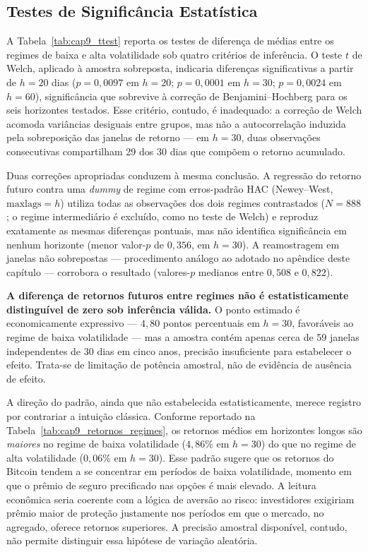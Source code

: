 \subsection{Testes de Significância Estatística}
\label{sec:cap9_ttest}

A Tabela~\ref{tab:cap9_ttest} reporta os testes de diferença de médias
entre os regimes de baixa e alta volatilidade sob quatro critérios de
inferência. O teste $t$ de Welch, aplicado à amostra sobreposta,
indicaria diferenças significativas a partir de $h = 20$ dias
($p = 0{,}0097$ em $h=20$; $p = 0{,}0001$ em $h=30$; $p = 0{,}0024$ em
$h=60$), significância que sobrevive à correção de Benjamini--Hochberg
para os seis horizontes testados. Esse critério, contudo, é inadequado:
a correção de Welch acomoda variâncias desiguais entre grupos, mas não
a autocorrelação induzida pela sobreposição das janelas de retorno --- em
$h=30$, duas observações consecutivas compartilham 29 dos 30 dias que
compõem o retorno acumulado.

Duas correções apropriadas conduzem à mesma conclusão. A regressão do
retorno futuro contra uma \textit{dummy} de regime com erros-padrão HAC
(Newey--West, $\text{maxlags}=h$) utiliza todas as observações dos dois
regimes contrastados ($N = 888$; o regime intermediário é excluído,
como no teste de Welch) e reproduz exatamente as mesmas diferenças
pontuais, mas
não identifica significância em nenhum horizonte (menor valor-$p$ de
$0{,}356$, em $h=30$). A reamostragem em janelas não sobrepostas ---
procedimento análogo ao adotado no apêndice deste capítulo --- corrobora
o resultado (valores-$p$ medianos entre $0{,}508$ e $0{,}822$).

\textbf{A diferença de retornos futuros entre regimes não é
estatisticamente distinguível de zero sob inferência válida.} O ponto
estimado é economicamente expressivo --- $4{,}80$ pontos percentuais em
$h=30$, favoráveis ao regime de baixa volatilidade --- mas a amostra
contém apenas cerca de 59 janelas independentes de 30 dias em cinco
anos, precisão insuficiente para estabelecer o efeito. Trata-se de
limitação de potência amostral, não de evidência de ausência de efeito.



A direção do padrão, ainda que não estabelecida estatisticamente,
merece registro por contrariar a intuição clássica. Conforme reportado
na Tabela~\ref{tab:cap9_retornos_regimes}, os retornos médios em
horizontes longos são \emph{maiores} no regime de baixa volatilidade
($4{,}86\%$ em $h = 30$) do que no regime de alta volatilidade
($0{,}06\%$ em $h = 30$). Esse padrão sugere que os retornos do Bitcoin
tendem a se concentrar em períodos de baixa volatilidade, momento em que
o prêmio de seguro precificado nas opções é mais elevado. A leitura
econômica seria coerente com a lógica de aversão ao risco: investidores
exigiriam prêmio maior de proteção justamente nos períodos em que o
mercado, no agregado, oferece retornos superiores. A precisão amostral
disponível, contudo, não permite distinguir essa hipótese de variação
aleatória.

